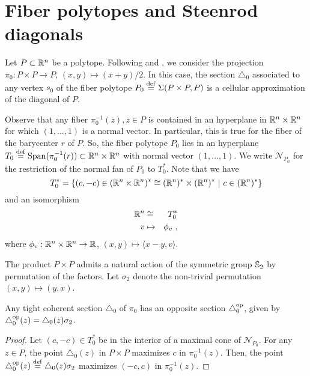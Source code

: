 
\section{Fiber polytopes and Steenrod diagonals} \label{s:fiber polytopes and Steenrod diagonals}

Let $P \subset \R^n$ be a polytope.
Following \cite{MTTV19} and \cite{GLA21}, we consider the projection $\pi_0 \colon P \times P \to P$, $(x,y) \mapsto (x+y)/2$.
In this case, the section $\triangle_0$ associated to any vertex $s_0$ of the fiber polytope $P_0 \defeq \Sigma(P \times P,P)$ is a cellular approximation of the diagonal of $P$.

Observe that any fiber $\pi_0^{-1}(z), z \in P$ is contained in an hyperplane in $\R^n\times\R^n$ for which $(1, \dots, 1)$ is a normal vector.
In particular, this is true for the fiber of the barycenter $r$ of $P$.
So, the fiber polytope $P_0$ lies in an hyperplane $T_0 \defeq \LinSpan (\pi_0^{-1}(r)) \subset \R^n \times \R^n$ with normal vector $(1,\ldots,1)$.
We write $\mathcal{N}_{P_0}$ for the restriction of the normal fan of $P_0$ to $T_0^{*}$. Note that we have $$T_0^{*}=\{(c,-c) \in (\R^n \times \R^n)^{*}\cong (\R^n)^{*}\times (\R^n)^{*} \ | \ c \in (\R^n)^{*}\}$$
and an isomorphism
\begin{eqnarray*}
    \R^n & \cong & T_0^{*} \\
    v & \mapsto & \phi_v \ ,
\end{eqnarray*}
where $\phi_v : \R^n \times \R^n \to \R$, $(x,y) \mapsto \langle x-y, v \rangle$.

The product $P \times P$ admits a natural action of the symmetric group $\S_2$ by permutation of the factors.
Let $\sigma_2$ denote the non-trivial permutation $(x,y)\mapsto (y,x)$.

\begin{proposition}
	Any tight coherent section $\triangle_0$ of $\pi_0$ has an opposite section $\triangle_0^{\op}$, given by $\triangle_0^{\op}(z)=\triangle_0(z)\sigma_2$.
\end{proposition}

\begin{proof}
	Let $(c,-c) \in T_0^{*}$ be in the interior of a maximal cone of $\mathcal{N}_{P_0}$.
	For any $z\in P$, the point $\triangle_0(z)$ in $P \times P$ maximizes $c$ in $\pi_0^{-1}(z)$.
	Then, the point $\triangle_0^{\op}(z) \defeq \triangle_0(z)\sigma_2$ maximizes $(-c,c)$ in $\pi_0^{-1}(z)$.
\end{proof}

